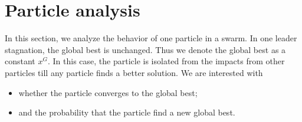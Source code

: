 \section{Particle analysis}
\label{sec:particle}





In this section, we analyze the behavior of one particle in a swarm.
In one leader stagnation, the global best is unchanged.
Thus we denote the global best as a constant $ x^{G} $.
In this case, the particle is isolated from the impacts from other particles till any particle finds a better solution.
We are interested with 
\begin{itemize}
\item whether the particle converges to the global best;
\item and the probability that the particle find a new global best.
\end{itemize}

